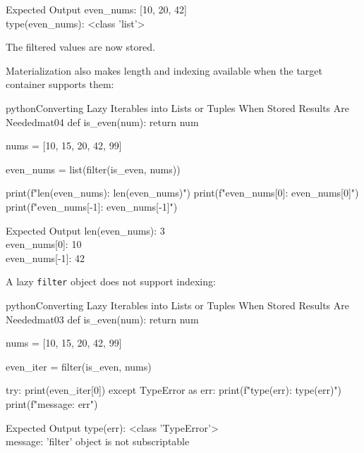 \documentclass[a4paper,twoside]{report}
\begin{document}
\begin{iobox}{Expected Output}
even\_nums: [10, 20, 42] \\
type(even\_nums): <class 'list'> \\
\end{iobox}




The filtered values are now stored.

Materialization also makes length and indexing available when the target container supports them:

\begin{codebox}[]{python}{Converting Lazy Iterables into Lists or Tuples When Stored Results Are Needed}{mat04}
def is_even(num):
    return num %

nums = [10, 15, 20, 42, 99]

even_nums = list(filter(is_even, nums))

print(f"len(even_nums): {len(even_nums)}")
print(f"even_nums[0]: {even_nums[0]}")
print(f"even_nums[-1]: {even_nums[-1]}")
\end{codebox}


\begin{iobox}{Expected Output}
len(even\_nums): 3 \\
even\_nums[0]: 10 \\
even\_nums[-1]: 42 \\
\end{iobox}




A lazy \texttt{filter} object does not support indexing:

\begin{codebox}[]{python}{Converting Lazy Iterables into Lists or Tuples When Stored Results Are Needed}{mat03}
def is_even(num):
    return num %

nums = [10, 15, 20, 42, 99]

even_iter = filter(is_even, nums)

try:
    print(even_iter[0])
except TypeError as err:
    print(f"type(err): {type(err)}")
    print(f"message: {err}")
\end{codebox}


\begin{iobox}{Expected Output}
type(err): <class 'TypeError'> \\
message: 'filter' object is not subscriptable \\
\end{iobox}
\end{document}
